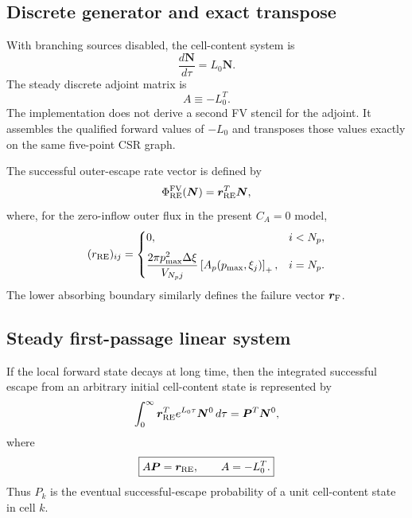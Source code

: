 \documentclass[11pt]{article}
\newcommand{\Pvec}{\bm P}
\newcommand{\Nvec}{\bm N}
\newcommand{\rRE}{\bm r_{\rm RE}}
\newcommand{\rF}{\bm r_{\rm F}}
\begin{document}
\subsection{Discrete generator and exact transpose}

With branching sources disabled, the cell-content system is
\begin{equation}
 \boxed{
 \frac{d\Nvec}{d\tau}=L_0\Nvec.
 }
 \label{eq:L0}
\end{equation}
The steady discrete adjoint matrix is
\begin{equation}
 A\equiv -L_0^T.
 \label{eq:A_matrix}
\end{equation}
The implementation does not derive a second FV stencil for the adjoint.  It assembles the
qualified forward values of $-L_0$ and transposes those values exactly on the same
five-point CSR graph.

The successful outer-escape rate vector is defined by
\begin{equation}
 \Phi_{\rm RE}^{\rm FV}(\Nvec)=\rRE^T\Nvec,
\end{equation}
where, for the zero-inflow outer flux in the present $C_A=0$ model,
\begin{equation}
 (r_{\rm RE})_{ij}
 =\begin{cases}
 0, & i<N_p,\\[2mm]
 \displaystyle
 \frac{2\pi p_{\max}^2\Delta\xi}{V_{N_pj}}
 \left[A_p(p_{\max},\xi_j)\right]_+,
 & i=N_p.
 \end{cases}
 \label{eq:rre}
\end{equation}
The lower absorbing boundary similarly defines the failure vector $\rF$.

\subsection{Steady first-passage linear system}

If the local forward state decays at long time, then the integrated successful escape from
an arbitrary initial cell-content state is represented by
\begin{equation}
 \int_0^\infty \rRE^T e^{L_0\tau}\Nvec^0\,d\tau
 =\Pvec^T\Nvec^0,
\end{equation}
where
\begin{equation}
 \boxed{
 A\Pvec=\rRE,
 \qquad A=-L_0^T.
 }
 \label{eq:discrete_rpf}
\end{equation}
Thus $P_k$ is the eventual successful-escape probability of a unit cell-content state in
cell $k$.
\end{document}
